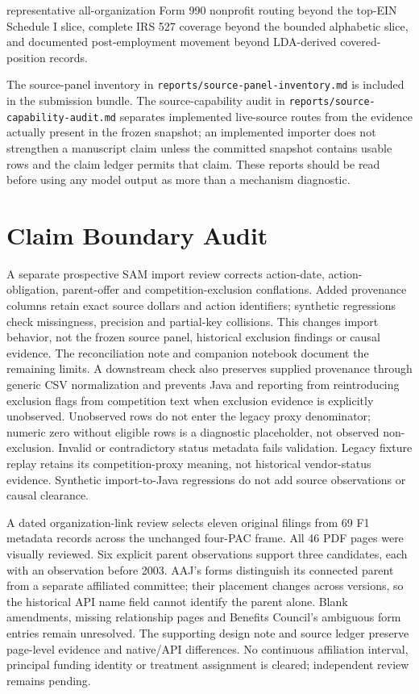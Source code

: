 representative all-organization Form 990 nonprofit routing beyond the top-EIN Schedule I slice, complete IRS 527 coverage beyond the bounded alphabetic slice, and documented post-employment movement beyond LDA-derived covered-position records.

The source-panel inventory in \texttt{reports/source-panel-inventory.md} is included in the submission bundle. The source-capability audit in \texttt{reports/source-capability-audit.md} separates implemented live-source routes from the evidence actually present in the frozen snapshot; an implemented importer does not strengthen a manuscript claim unless the committed snapshot contains usable rows and the claim ledger permits that claim. These reports should be read before using any model output as more than a mechanism diagnostic.

\section{Claim Boundary Audit}

A separate prospective SAM import review corrects action-date, action-obligation,
parent-offer and competition-exclusion conflations. Added provenance columns
retain exact source dollars and action identifiers; synthetic regressions check
missingness, precision and partial-key collisions. This changes import behavior,
not the frozen source panel, historical exclusion findings or causal evidence.
The reconciliation note and companion notebook document the remaining limits.
A downstream check also preserves supplied provenance through generic CSV
normalization and prevents Java and reporting from reintroducing exclusion
flags from competition text when exclusion evidence is explicitly unobserved.
Unobserved rows do not enter the legacy proxy denominator; numeric zero without
eligible rows is a diagnostic placeholder, not observed non-exclusion. Invalid
or contradictory status metadata fails validation. Legacy fixture replay retains
its competition-proxy meaning, not historical vendor-status evidence. Synthetic
import-to-Java regressions do not add source observations or causal clearance.

A dated organization-link review selects eleven original filings from 69 F1
metadata records across the unchanged four-PAC frame. All 46 PDF pages were
visually reviewed. Six explicit parent observations support three candidates,
each with an observation before 2003. AAJ's forms distinguish its connected
parent from a separate affiliated committee; their placement changes across
versions, so the historical API name field cannot identify the parent alone.
Blank amendments, missing relationship pages and Benefits Council's ambiguous
form entries remain unresolved. The supporting design note and source ledger
preserve page-level evidence and native/API differences. No continuous
affiliation interval, principal funding identity or treatment assignment is
cleared; independent review remains pending.

